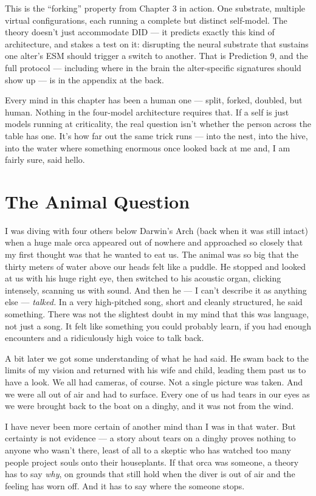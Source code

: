 \documentclass[11pt, twoside, openright]{book}
\begin{document}
This is the ``forking'' property from Chapter 3 in action. One substrate, multiple virtual configurations, each running a complete but distinct self-model. The theory doesn't just accommodate DID --- it predicts exactly this kind of architecture, and stakes a test on it: disrupting the neural substrate that sustains one alter's ESM should trigger a switch to another. That is Prediction 9, and the full protocol --- including where in the brain the alter-specific signatures should show up --- is in the appendix at the back.

Every mind in this chapter has been a human one --- split, forked, doubled, but human. Nothing in the four-model architecture requires that. If a self is just models running at criticality, the real question isn't whether the person across the table has one. It's how far out the same trick runs --- into the nest, into the hive, into the water where something enormous once looked back at me and, I am fairly sure, said hello.


\chapter{The Animal Question}

I was diving with four others below Darwin's Arch (back when it was still intact) when a huge male orca appeared out of nowhere and approached so closely that my first thought was that he wanted to eat us. The animal was so big that the thirty meters of water above our heads felt like a puddle. He stopped and looked at us with his huge right eye, then switched to his acoustic organ, clicking intensely, scanning us with sound. And then he --- I can't describe it as anything else --- \textit{talked.} In a very high-pitched song, short and cleanly structured, he said something. There was not the slightest doubt in my mind that this was language, not just a song. It felt like something you could probably learn, if you had enough encounters and a ridiculously high voice to talk back.

A bit later we got some understanding of what he had said. He swam back to the limits of my vision and returned with his wife and child, leading them past us to have a look. We all had cameras, of course. Not a single picture was taken. And we were all out of air and had to surface. Every one of us had tears in our eyes as we were brought back to the boat on a dinghy, and it was not from the wind.

I have never been more certain of another mind than I was in that water. But certainty is not evidence --- a story about tears on a dinghy proves nothing to anyone who wasn't there, least of all to a skeptic who has watched too many people project souls onto their houseplants. If that orca was someone, a theory has to say \textit{why}, on grounds that still hold when the diver is out of air and the feeling has worn off. And it has to say where the someone stops.
\end{document}
